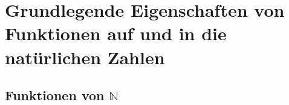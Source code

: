 \documentclass[main.tex]{subfiles}
\begin{document}
\section{Grundlegende Eigenschaften von Funktionen auf und in die natürlichen Zahlen}

\subsection{Funktionen von \(\mathbb{N}\)}

\begin{tabproof}
\end{tabproof}

\begin{tabproof}
\end{tabproof}
\end{document}
